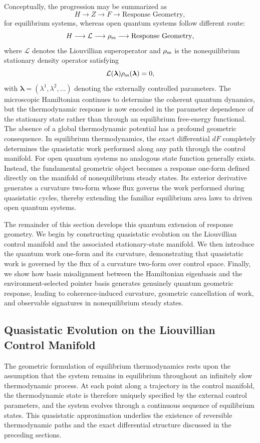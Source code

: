 Conceptually, the progression may be summarized as
\[
H
\longrightarrow
Z
\longrightarrow
F
\longrightarrow
\text{Response Geometry},
\]
for equilibrium systems, whereas open quantum systems follow
different route:
\[
H
\longrightarrow
\mathcal{L}
\longrightarrow
\rho_{\rm ss}
\longrightarrow
\text{Response Geometry},
\]
where \(\mathcal{L}\) denotes the Liouvillian superoperator and
\(\rho_{\rm ss}\) is the nonequilibrium stationary density
operator satisfying
\[ \mathcal{L}(\bm{\lambda}) \rho_{\rm ss}(\bm{\lambda})
=0,
\]
with
\(\bm{\lambda}=(\lambda^1,\lambda^2,\ldots)\)
denoting the externally controlled parameters. The microscopic
Hamiltonian continues to determine the coherent quantum
dynamics, but the thermodynamic response is now encoded in the
parameter dependence of the stationary state rather than through
an equilibrium free-energy functional.
The absence of a global thermodynamic potential has a profound
geometric consequence. In equilibrium thermodynamics, the exact
differential \(dF\) completely determines the quasistatic work
performed along any path through the control manifold. For open
quantum systems no analogous state function generally exists.
Instead, the fundamental geometric object becomes a response
one-form defined directly on the manifold of nonequilibrium
steady states. Its exterior derivative generates a curvature
two-form whose flux governs the work performed during quasistatic
cycles, thereby extending the familiar equilibrium area laws to
driven open quantum systems.

The remainder of this section develops this quantum extension of
response geometry. We begin by constructing quasistatic
evolution on the Liouvillian control manifold and the associated
stationary-state manifold. We then introduce the quantum work
one-form and its curvature, demonstrating that quasistatic work
is governed by the flux of a curvature two-form over control
space. Finally, we show how basis misalignment between the
Hamiltonian eigenbasis and the environment-selected pointer
basis generates genuinely quantum geometric response, leading to
coherence-induced curvature, geometric cancellation of work, and
observable signatures in nonequilibrium steady states.

\subsection{Quasistatic Evolution on the Liouvillian Control Manifold}
The geometric formulation of equilibrium thermodynamics rests upon
the assumption that the system remains in equilibrium throughout
an infinitely slow thermodynamic process. At each point along a
trajectory in the control manifold, the thermodynamic state is
therefore uniquely specified by the external control parameters,
and the system evolves through a continuous sequence of
equilibrium states. This quasistatic approximation underlies the
existence of reversible thermodynamic paths and the exact
differential structure discussed in the preceding sections.

